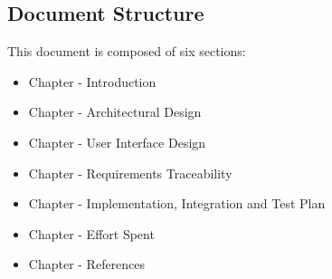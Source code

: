 \subsection{Document Structure}
\label{sec:doc_structure}%
This document is composed of six sections:
\begin{itemize}
    \item{}  Chapter - Introduction
    \item{}  Chapter - Architectural Design
    \item{}  Chapter - User Interface Design
    \item{}  Chapter - Requirements Traceability
    \item{}  Chapter - Implementation, Integration and Test Plan
    \item{}  Chapter - Effort Spent
    \item{}  Chapter - References
\end{itemize}
